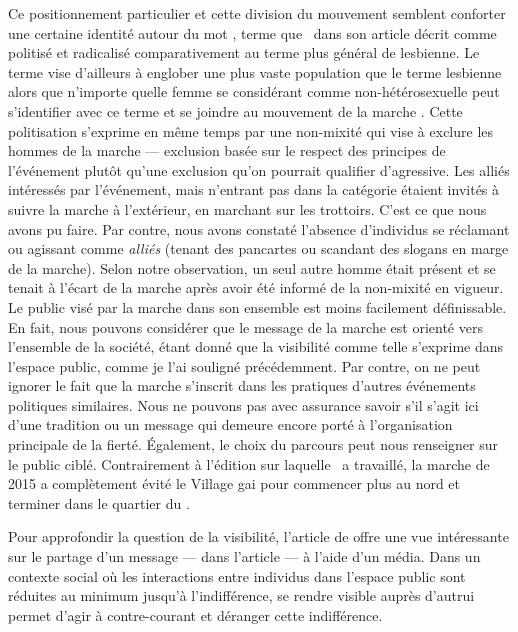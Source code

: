 Ce positionnement particulier et cette division du mouvement semblent conforter une certaine identité autour du mot \dyke{}, terme que~\citet{Podmore2015a} dans son article  décrit comme politisé et radicalisé comparativement au terme plus général de lesbienne.
Le terme \dyke{} vise d'ailleurs à englober une plus vaste population que le terme lesbienne alors que n'importe quelle femme se considérant comme non-hétérosexuelle peut s'identifier avec ce terme et se joindre au mouvement de la marche \dyke{}.
Cette politisation s'exprime en même temps par une non-mixité qui vise à exclure les hommes de la marche --- exclusion basée sur le respect des principes de l'événement plutôt qu'une exclusion qu'on pourrait qualifier d'agressive.
Les alliés intéressés par l'événement, mais n'entrant pas dans la catégorie \dyke{} étaient invités à suivre la marche à l'extérieur, en marchant sur les trottoirs.
C'est ce que nous avons pu faire.
Par contre, nous avons constaté l'absence d'individus se réclamant ou agissant comme \emph{alliés} (tenant des pancartes ou scandant des slogans en marge de la marche).
Selon notre observation, un seul autre homme était présent et se tenait à l'écart de la marche après avoir été informé de la non-mixité en vigueur.
Le public visé par la marche dans son ensemble est moins facilement définissable.
En fait, nous pouvons considérer que le message de la marche est orienté vers l'ensemble de la société, étant donné que la visibilité comme telle s'exprime dans l'espace public, comme je l'ai souligné précédemment.
Par contre, on ne peut ignorer le fait que la marche s'inscrit dans les pratiques d'autres événements politiques similaires.
Nous ne pouvons pas avec assurance savoir s'il s'agit ici d'une tradition ou un message qui demeure encore porté à l'organisation principale de la fierté.
Également, le choix du parcours peut nous renseigner sur le public ciblé.
Contrairement à l'édition sur laquelle~\citet{Podmore2015a} a travaillé, la marche de 2015 a complètement évité le Village gai pour commencer plus au nord et terminer dans le quartier du .

Pour approfondir la question de la visibilité, l'article de \citet{Frosh2006}  offre une vue intéressante sur le partage d'un message ---  dans l'article --- à l'aide d'un média.
Dans un contexte social où les interactions entre individus dans l'espace public sont réduites au minimum jusqu'à l'indifférence, se rendre visible auprès d'autrui permet d'agir à contre-courant et déranger cette indifférence.


